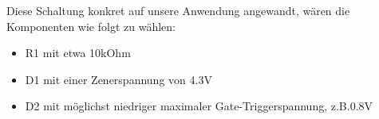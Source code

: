 Diese Schaltung konkret auf unsere Anwendung angewandt, wären die Komponenten wie folgt zu wählen:
\begin{itemize}
    \item R1 mit etwa 10kOhm
    \item D1 mit einer Zenerspannung von 4.3V
    \item D2 mit möglichst niedriger maximaler Gate-Triggerspannung, z.B.0.8V
\end{itemize}

